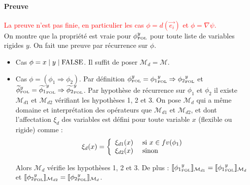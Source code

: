\documentclass[12pt]{article}
\newcommand{\FOL}{\ensuremath{\textup{\tiny{}FOL}}}
\newcommand{\raph}[1]{\textcolor{red}{#1}}
\begin{document}
\paragraph{Preuve}
\raph{La preuve n'est pas finie, en particulier les cas $\phi = d(\vec{e_i})$ et $\phi = \nabla \psi$.}\\
On montre que la propriété est vraie pour $\phi_\FOL^y$ pour toute liste de variables rigides $y$.
On fait une preuve par récurrence sur $\phi$.
\begin{itemize}
\item
  Cas $\phi = x \; | \; y \; | \; \textup{FALSE}$.
  Il suffit de poser $\mathcal{M}_d = \mathcal{M}$.
\item
  Cas $\phi = (\phi_1 \Rightarrow \phi_2)$.
  Par définition ${\phi}_\FOL^y = {\phi_1}_\FOL^y \Rightarrow {\phi_2}_\FOL^y$ et  $\widetilde{\phi}_\FOL^y = \widetilde{\phi_1}_\FOL^y \Rightarrow \widetilde{\phi_2}_\FOL^y$.
  Par hypothèse de récurrence sur $\phi_1$ et $\phi_2$ il existe $\mathcal{M}_{d1}$ et $\mathcal{M}_{d2}$ vérifiant les hypothèses 1, 2 et 3.
  On pose $\mathcal{M}_d$ qui a même domaine et interprétation des opérateurs que $\mathcal{M}_{d1}$ et $\mathcal{M}_{d2}$, et dont l'affectation $\xi_d$ des variables est défini pour toute variable $x$ (flexible ou rigide) comme :
  \[
    \xi_d(x) = \left \{
      \begin{array}{l l}
        \xi_{d1}(x) & \mbox{ si } x \in fv(\phi_1) \\
        \xi_{d2}(x) & \mbox{ sinon }
      \end{array}
    \right .
  \]

  Alors $\mathcal{M}_d$ vérifie les hypothèses 1, 2 et 3.
  De plus : $\llbracket {\phi_1}_\FOL^y \rrbracket_{\mathcal{M}_{d1}} = \llbracket {\phi_1}_\FOL^y \rrbracket_{\mathcal{M}_{d}}$
  et  $\llbracket {\phi_2}_\FOL^y \rrbracket_{\mathcal{M}_{d2}} = \llbracket {\phi_2}_\FOL^y \rrbracket_{\mathcal{M}_{d}}$.



\end{itemize}
\end{document}
